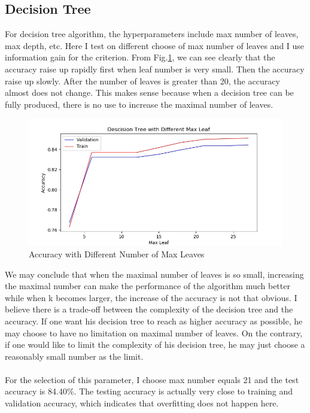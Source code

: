 \documentclass[11pt]{article}
\begin{document}
\subsection{Decision Tree}
For decision tree algorithm, the hyperparameters include max number of leaves, max depth, etc. Here I test on different choose of max number of leaves and I use information gain for the criterion. From Fig.\ref{fig:adult_dt}, we can see clearly that the accuracy raise up rapidly first when leaf number is very small. Then the accuracy raise up slowly. After the number of leaves is greater than 20, the accuracy almost does not change. This makes sense because when a decision tree can be fully produced, there is no use to increase the maximal number of leaves.
\begin{figure}[h!]
  \includegraphics[width=\linewidth]{./adult/dt_maxleaf.jpg}
  \caption{Accuracy with Different Number of Max Leaves}
  \label{fig:adult_dt}
\end{figure}
We may conclude that when the maximal number of leaves is so small, increasing the maximal number can make the performance of the algorithm much better while when k becomes larger, the increase of the accuracy is not that obvious. I believe there is a trade-off between the complexity of the decision tree and the accuracy. If one want his decision tree to reach as higher accuracy as possible, he may choose to have no limitation on maximal number of leaves. On the contrary, if one would like to limit the complexity of his decision tree, he may just choose a reasonably small number as the limit. \\
\\
For the selection of this parameter, I choose max number equals 21 and the test accuracy is 84.40\%. The testing accuracy is actually very close to training and validation accuracy, which indicates that overfitting does not happen here.
\end{document}
